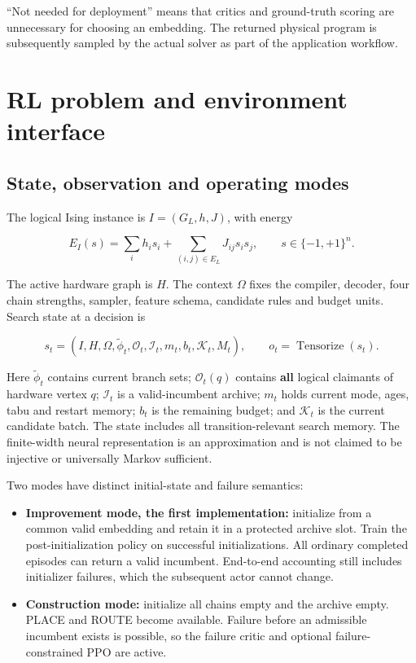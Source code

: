 \documentclass[10pt,a4paper]{article}
\providecommand{\tightlist}{\setlength{\itemsep}{1pt}\setlength{\parskip}{0pt}}
\begin{document}
\endgroup

``Not needed for deployment'' means that critics and ground-truth
scoring are unnecessary for choosing an embedding. The returned physical
program is subsequently sampled by the actual solver as part of the
application workflow.

\hypertarget{rl-problem-and-environment-interface}{%
\section{RL problem and environment
interface}\label{rl-problem-and-environment-interface}}

\hypertarget{state-observation-and-operating-modes}{%
\subsection{State, observation and operating
modes}\label{state-observation-and-operating-modes}}

The logical Ising instance is \(I=(G_L,h,J)\), with energy

\[
E_I(s)=\sum_i h_i s_i+\sum_{(i,j)\in E_L}J_{ij}s_i s_j,
\qquad s\in\{-1,+1\}^{n}.
\tag{1}
\]

The active hardware graph is \(H\). The context \(\Omega\) fixes the
compiler, decoder, four chain strengths, sampler, feature schema,
candidate rules and budget units. Search state at a decision is

\[
s_t=(I,H,\Omega,\widetilde\phi_t,\mathcal O_t,\mathcal I_t,m_t,b_t,\mathcal K_t,M_t),
\qquad o_t=\operatorname{Tensorize}(s_t).
\tag{2}
\]

Here \(\widetilde\phi_t\) contains current branch sets;
\(\mathcal O_t(q)\) contains \textbf{all} logical claimants of hardware
vertex \(q\); \(\mathcal I_t\) is a valid-incumbent archive; \(m_t\)
holds current mode, ages, tabu and restart memory; \(b_t\) is the
remaining budget; and \(\mathcal K_t\) is the current candidate batch.
The state includes all transition-relevant search memory. The
finite-width neural representation is an approximation and is not
claimed to be injective or universally Markov sufficient.

Two modes have distinct initial-state and failure semantics:

\begin{itemize}
\tightlist
\item
  \textbf{Improvement mode, the first implementation:} initialize from a
  common valid embedding and retain it in a protected archive slot.
  Train the post-initialization policy on successful initializations.
  All ordinary completed episodes can return a valid incumbent.
  End-to-end accounting still includes initializer failures, which the
  subsequent actor cannot change.
\item
  \textbf{Construction mode:} initialize all chains empty and the
  archive empty. PLACE and ROUTE become available. Failure before an
  admissible incumbent exists is possible, so the failure critic and
  optional failure-constrained PPO are active.
\end{itemize}
\end{document}
